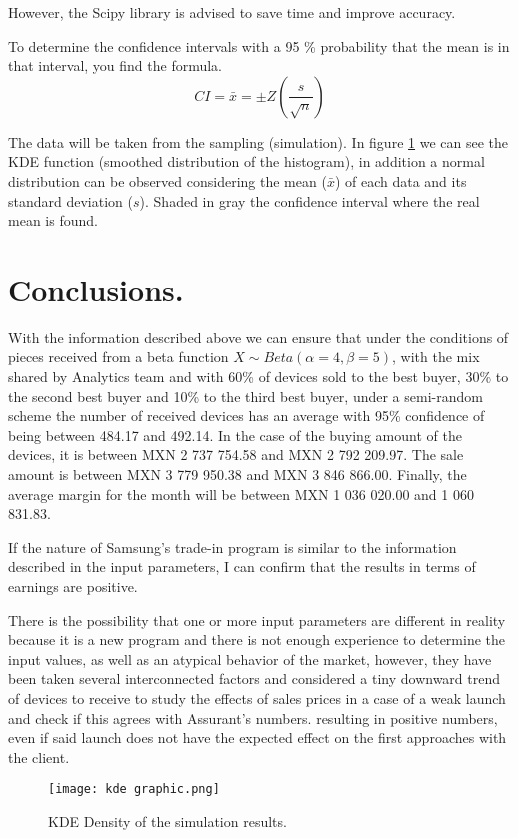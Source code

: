 \documentclass[11pt,a4paper,twocolumn]{article}
\begin{document}
However, the Scipy library is advised to save time and improve accuracy.

To determine the confidence intervals with a 95 \% probability that the mean is in that interval, you find the formula.
$$
CI = \bar{x}=\pm Z (\frac{s}{\sqrt{n}})
$$

The data will be taken from the sampling (simulation). In figure \ref{fig:image 4} we can see the KDE function (smoothed distribution of the histogram), in addition a normal distribution can be observed considering the mean ($\bar{x}$) of each data and its standard deviation ($s$). Shaded in gray the confidence interval where the real mean is found.

\section{Conclusions.}

With the information described above we can ensure that under the conditions of pieces received from a beta function $X \sim Beta(\alpha =4,\beta= 5)$, with the mix shared by Analytics team and with 60\% of devices sold to the best buyer, 30\% to the second best buyer and 10\% to the third best buyer, under a semi-random scheme the number of received devices has an average with 95\% confidence of being between 484.17 and 492.14. In the case of the buying amount of the devices, it is between MXN 2 737 754.58 and MXN 2 792 209.97. The sale amount is between MXN 3 779 950.38 and MXN 3 846 866.00. Finally, the average margin for the month will be between MXN 1 036 020.00 and 1 060 831.83.

If the nature of Samsung's trade-in program is similar to the information described in the input parameters, I can confirm that the results in terms of earnings are positive.

There is the possibility that one or more input parameters are different in reality because it is a new program and there is not enough experience to determine the input values, as well as an atypical behavior of the market, however, they have been taken several interconnected factors and considered a tiny downward trend of devices to receive to study the effects of sales prices in a case of a weak launch and check if this agrees with Assurant's numbers. resulting in positive numbers, even if said launch does not have the expected effect on the first approaches with the client.

\begin{figure}[t]
\centering
\caption{KDE Density of the simulation results.}
\texttt{[image: kde graphic.png]}
\label{fig:image 4}
\end{figure} 
\end{document}
